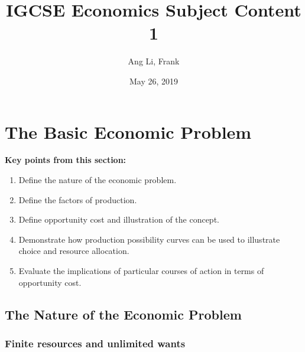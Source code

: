 \documentclass[11pt, a4paper, openany]{book}
\title{\textbf{IGCSE Economics Subject Content 1}}
\author{Ang Li, Frank}
\date{May 26, 2019}
\begin{document}
\newcommand{\head}[1]{\textnormal{\textbf{#1}}}

\fancyhf{}
\renewcommand{\headrulewidth}{2pt}
\renewcommand{\footrulewidth}{1pt}
\fancyhead[LE]{\leftmark}
\fancyhead[RO]{\nouppercase{\rightmark}}
\fancyfoot[LE, RO]{\thepage}

\maketitle
\tableofcontents

\chapter{The Basic Economic Problem}

\begin{tcolorbox}
\textbf{Key points from this section:}
\begin{enumerate}\itemsep0em
	\item Define the nature of the economic problem.
	\item Define the factors of production.
	\item Define opportunity cost and illustration of the concept.
	\item Demonstrate how production possibility curves can be used to illustrate choice and resource allocation.
	\item Evaluate the implications of particular courses of action in terms of opportunity cost.
\end{enumerate}
\end{tcolorbox}

\section{The Nature of the Economic Problem}

\subsection{Finite resources and unlimited wants}
\end{document}
